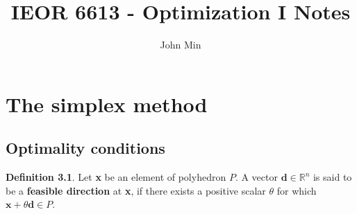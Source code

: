 \documentclass{report}
\theoremstyle{plain}
\theoremstyle{definition}
\newtheorem{defn}[thm]{Definition} %
\begin{document}
\title{IEOR 6613 - Optimization I Notes}
\author{John Min}
\maketitle

\chapter{}
\chapter{}
\chapter{The simplex method}

\section{Optimality conditions}

\begin{defn}
Let \textbf{x} be an element of polyhedron $P$.   A vector $\mathbf{d} \in \mathbb{R}^n$ is said to be a \textbf{feasible direction} at \textbf{x}, if there exists a positive scalar $\theta$ for which $\mathbf{x} + \theta \mathbf{d} \in P$.
\end{defn}
\end{document}
